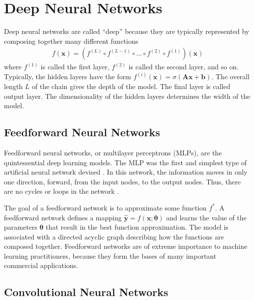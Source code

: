 \documentclass{scrartcl}
\begin{document}
\newpage


\section{Deep Neural Networks}
\label{sec:dnn}

Deep neural networks are called ``deep'' because they are typically represented by composing together many different functions
\begin{align}
f(\mathbf x) = (f^{(L)} \circ f^{(L-1)} \circ \dots \circ f^{(2)} \circ f^{(1)})(\mathbf x)
\end{align} 
where $f^{(1)}$ is called the first layer, $f^{(2)}$ is called the second layer, and so on. Typically, the hidden layers have the form $f^{(i)}(\mathbf x) = \sigma(\mathbf A\mathbf x + \mathbf b)$. The overall length $L$ of the chain gives the depth of the model. The final layer is called output layer. The dimensionality of the hidden layers determines the width of the model. 

\subsection{Feedforward Neural Networks}

Feedforward neural networks, or multilayer perceptrons (MLPs), are the quintessential deep learning models. The MLP was the first and simplest type of artificial neural network devised \cite{Schmidhuber2015}. In this network, the information moves in only one direction, forward, from the input nodes, to the output nodes. Thus, there are no cycles or loops in the network \cite{Zell1994}.

The goal of a feedforward network is to approximate some function $f^*$. A feedforward network defines a mapping $\hat{\mathbf y} = f(\mathbf x; \boldsymbol \theta)$ and learns the value of the parameters $\boldsymbol \theta$ that result in the best function approximation. The model is associated with a directed acyclic graph describing how the functions are composed together. Feedforward networks are of extreme importance to machine learning practitioners, because they form the bases of many important commercial applications. 

\subsection{Convolutional Neural Networks}
\end{document}
